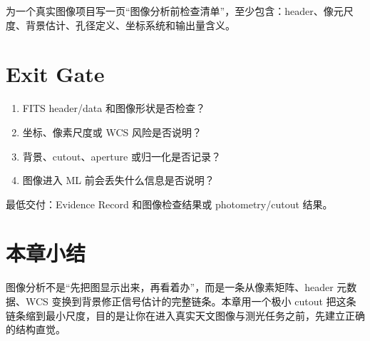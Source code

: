 \begin{exercisebox}[开放练习]
为一个真实图像项目写一页“图像分析前检查清单”，至少包含：header、像元尺度、背景估计、孔径定义、坐标系统和输出量含义。
\end{exercisebox}

\section{Exit Gate}

\begin{enumerate}
    \item FITS header/data 和图像形状是否检查？
    \item 坐标、像素尺度或 WCS 风险是否说明？
    \item 背景、cutout、aperture 或归一化是否记录？
    \item 图像进入 ML 前会丢失什么信息是否说明？
\end{enumerate}

最低交付：Evidence Record 和图像检查结果或 photometry/cutout 结果。

\section{本章小结}

图像分析不是“先把图显示出来，再看着办”，而是一条从像素矩阵、header 元数据、WCS 变换到背景修正信号估计的完整链条。本章用一个极小 cutout 把这条链条缩到最小尺度，目的是让你在进入真实天文图像与测光任务之前，先建立正确的结构直觉。
